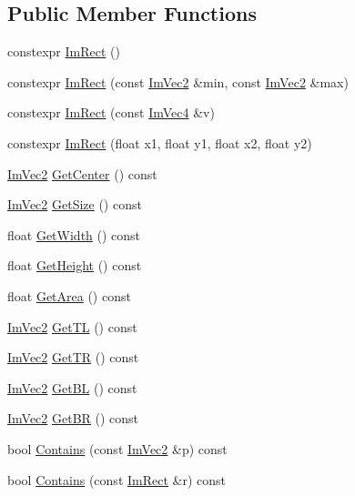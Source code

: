 \subsection*{Public Member Functions}
\begin{DoxyCompactItemize}
\item 
constexpr \hyperlink{structImRect_a1e9548c8a334dfd32eaf4d399aa740e9}{Im\+Rect} ()
\item 
constexpr \hyperlink{structImRect_af7bfb620fd01ea1f7c62c7c04e880ec4}{Im\+Rect} (const \hyperlink{structImVec2}{Im\+Vec2} \&min, const \hyperlink{structImVec2}{Im\+Vec2} \&max)
\item 
constexpr \hyperlink{structImRect_a79261b2cf06a797515ff63332762748a}{Im\+Rect} (const \hyperlink{structImVec4}{Im\+Vec4} \&v)
\item 
constexpr \hyperlink{structImRect_a8293a024ed727cf2873e51742ca629b2}{Im\+Rect} (float x1, float y1, float x2, float y2)
\item 
\hyperlink{structImVec2}{Im\+Vec2} \hyperlink{structImRect_aae13f8003184fd84f29d27c3c074cf43}{Get\+Center} () const
\item 
\hyperlink{structImVec2}{Im\+Vec2} \hyperlink{structImRect_ae459d9c50003058cfb34519a571aaf33}{Get\+Size} () const
\item 
float \hyperlink{structImRect_afa75cb8491f20901c96166d17dcddac4}{Get\+Width} () const
\item 
float \hyperlink{structImRect_a748d8ae9cb26508951ec6e2f2df0625b}{Get\+Height} () const
\item 
float \hyperlink{structImRect_acb166afad83795305190598a7b92a185}{Get\+Area} () const
\item 
\hyperlink{structImVec2}{Im\+Vec2} \hyperlink{structImRect_a1d4d972329722b51dca4499cb5931b4b}{Get\+TL} () const
\item 
\hyperlink{structImVec2}{Im\+Vec2} \hyperlink{structImRect_acae90248a96be4acf1524071fca1c3f3}{Get\+TR} () const
\item 
\hyperlink{structImVec2}{Im\+Vec2} \hyperlink{structImRect_a59d9751bc7be6745dddf5b83b9155669}{Get\+BL} () const
\item 
\hyperlink{structImVec2}{Im\+Vec2} \hyperlink{structImRect_ad2f2687254beed5a9b19bde0d6fa14f5}{Get\+BR} () const
\item 
bool \hyperlink{structImRect_ac583156fd0e9306181fff5d120b262ea}{Contains} (const \hyperlink{structImVec2}{Im\+Vec2} \&p) const
\item 
bool \hyperlink{structImRect_ad6043344d8ac30d5f342c71641cfe24b}{Contains} (const \hyperlink{structImRect}{Im\+Rect} \&r) const

\end{DoxyCompactItemize}
